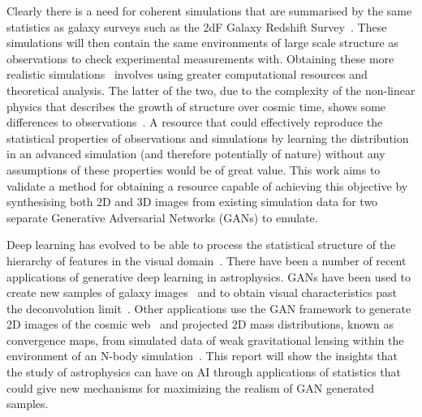 \documentclass[twocolumn]{article}
\numberwithin{equation}{section}
\begin{document}
Clearly there is a need for coherent simulations that are summarised by the same statistics as galaxy surveys such as the 2dF Galaxy Redshift Survey~\cite{2df}. These simulations will then contain the same environments of large scale structure as observations to check experimental measurements with. Obtaining these more realistic simulations~\cite{mill2sim, millxxlsim} involves using greater computational resources and theoretical analysis. The latter of the two, due to the complexity of the non-linear physics that describes the growth of structure over cosmic time, shows some differences to observations~\cite{mill_diffs}. A resource that could effectively reproduce the statistical properties of observations and simulations by learning the distribution in an advanced simulation (and therefore potentially of nature) without any assumptions of these properties would be of great value. This work aims to validate a method for obtaining a resource capable of achieving this objective by synthesising both 2D and 3D images from existing simulation data for two separate Generative Adversarial Networks (GANs) to emulate. 

Deep learning has evolved to be able to process the statistical structure of the hierarchy of features in the visual domain~\cite{nvidia_gan}. There have been a number of recent applications of generative deep learning in astrophysics. GANs have been used to create new samples of galaxy images~\cite{gal_im_gen2} and to obtain visual characteristics past the deconvolution limit~\cite{gal_im_gen3}. Other applications use the GAN framework to generate 2D images of the cosmic web~\cite{web_gan} and projected 2D mass distributions, known as convergence maps, from simulated data of weak gravitational lensing within the environment of an N-body simulation~\cite{cosmogan}. This report will show the insights that the study of astrophysics can have on AI through applications of statistics that could give new mechanisms for maximizing the realism of GAN generated samples. 
\end{document}

